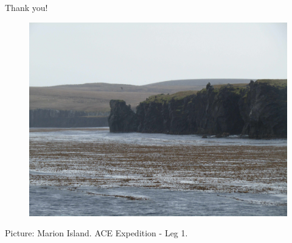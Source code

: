\documentclass{beamer}
\begin{document}

\begin{frame}
\Huge{\centerline{Thank you!}}
\begin{figure}
\includegraphics[width=0.7\linewidth]{acantilados_isla_marion.JPG}
\end{figure}
\tiny  Picture: Marion Island. ACE Expedition - Leg 1.
\end{frame}

\end{document}
